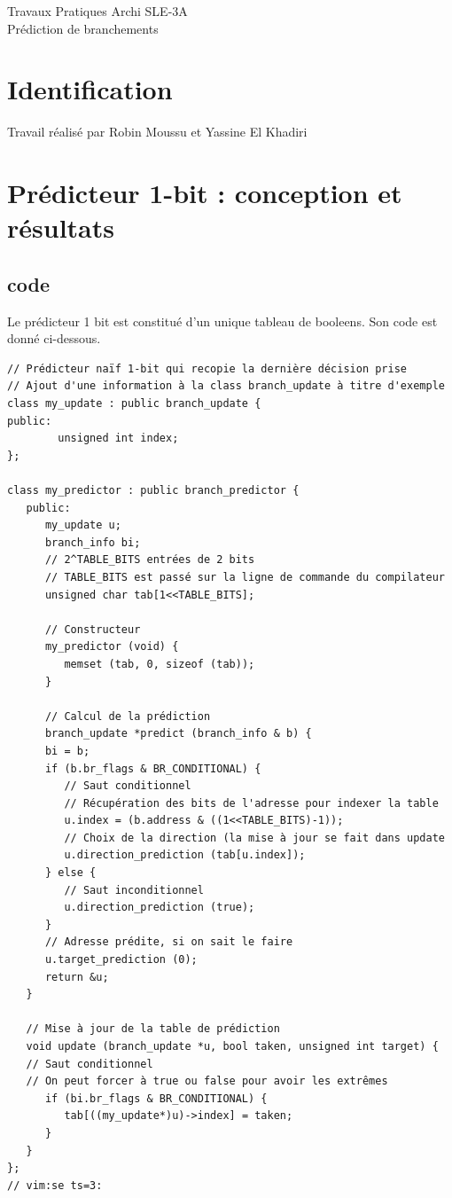 \documentclass[a4paper]{article}
\begin{document}
\begin{center}
\large
Travaux Pratiques Archi SLE-3A\\
\LARGE
Prédiction de branchements\\
\large

\end{center}
\section{Identification}
Travail réalisé par Robin Moussu et Yassine El Khadiri

\section{Prédicteur 1-bit : conception et résultats}
\subsection{code}
Le prédicteur 1 bit est constitué d'un unique tableau de booleens.
Son code est donné ci-dessous.
\small
\begin{verbatim}
// Prédicteur naïf 1-bit qui recopie la dernière décision prise
// Ajout d'une information à la class branch_update à titre d'exemple
class my_update : public branch_update {
public:
        unsigned int index;
};

class my_predictor : public branch_predictor {
   public:
      my_update u;
      branch_info bi;
      // 2^TABLE_BITS entrées de 2 bits
      // TABLE_BITS est passé sur la ligne de commande du compilateur
      unsigned char tab[1<<TABLE_BITS];

      // Constructeur
      my_predictor (void) { 
         memset (tab, 0, sizeof (tab));
      }

      // Calcul de la prédiction
      branch_update *predict (branch_info & b) {
      bi = b;
      if (b.br_flags & BR_CONDITIONAL) {
         // Saut conditionnel
         // Récupération des bits de l'adresse pour indexer la table
         u.index = (b.address & ((1<<TABLE_BITS)-1));
         // Choix de la direction (la mise à jour se fait dans update
         u.direction_prediction (tab[u.index]);
      } else {
         // Saut inconditionnel
         u.direction_prediction (true);
      }
      // Adresse prédite, si on sait le faire
      u.target_prediction (0);
      return &u;
   }

   // Mise à jour de la table de prédiction
   void update (branch_update *u, bool taken, unsigned int target) {
   // Saut conditionnel
   // On peut forcer à true ou false pour avoir les extrêmes
      if (bi.br_flags & BR_CONDITIONAL) {
         tab[((my_update*)u)->index] = taken;
      }
   }
};
// vim:se ts=3:
\end{verbatim}
\normalsize
\end{document}
